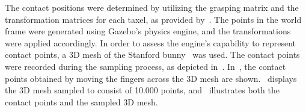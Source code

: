 The contact positions were determined by utilizing the grasping matrix  and the transformation matrices for each taxel, as provided by~\cite{ruppel-philipp-biotac-gazebo-plugin}. The points in the world frame  were generated using Gazebo's physics engine, and the transformations were applied accordingly. In order to assess the engine's capability to represent contact points, a 3D mesh of the Stanford bunny~\cite{stanford-bunny} was used. The contact points were recorded during the sampling process, as depicted in~. In~, the contact points obtained by moving the fingers across the 3D mesh are shown.~ displays the 3D mesh sampled to consist of \num{10,000} points, and~ illustrates both the contact points and the sampled 3D mesh.


